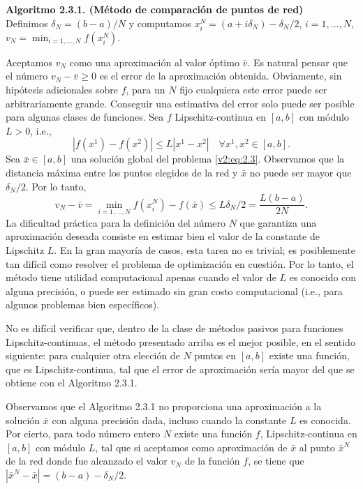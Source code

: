\noindent \textbf{Algoritmo 2.3.1. (Método de comparación de puntos de red)} \\
Definimos $\delta_N = (b - a)/N$ y computamos $x_i^N = (a + i\delta_N) - \delta_N/2$, $i = 1, \dots, N$, $v_N = \min_{i=1,\dots,N} f(x_i^N)$.

Aceptamos $v_N$ como una aproximación al valor óptimo $\bar{v}$. Es natural pensar que el número $v_N - \bar{v} \ge 0$ es el error de la aproximación obtenida. Obviamente, sin hipótesis adicionales sobre $f$, para un $N$ fijo cualquiera este error puede ser arbitrariamente grande. Conseguir una estimativa del error solo puede ser posible para algunas clases de funciones. Sea $f$ Lipschitz-continua en $[a, b]$ con módulo $L > 0$, i.e.,
\[
    |f(x^1) - f(x^2)| \le L|x^1 - x^2| \quad \forall x^1, x^2 \in [a, b].
\]
Sea $\bar{x} \in [a, b]$ una solución global del problema \eqref{v2:eq:2.3}. Observamos que la distancia máxima entre los puntos elegidos de la red y $\bar{x}$ no puede ser mayor que $\delta_N/2$. Por lo tanto,
\[
    v_N - \bar{v} = \min_{i=1,\dots,N} f(x_i^N) - f(\bar{x}) \le L \delta_N/2 = \frac{L(b - a)}{2N}.
\]
La dificultad práctica para la definición del número $N$ que garantiza una aproximación deseada consiste en estimar bien el valor de la constante de Lipschitz $L$. En la gran mayoría de casos, esta tarea no es trivial; es posiblemente tan difícil como resolver el problema de optimización en cuestión. Por lo tanto, el método tiene utilidad computacional apenas cuando el valor de $L$ es conocido con alguna precisión, o puede ser estimado sin gran costo computacional (i.e., para algunos problemas bien específicos).

No es difícil verificar que, dentro de la clase de métodos pasivos para funciones Lipschitz-continuas, el método presentado arriba es el mejor posible, en el sentido siguiente: para cualquier otra elección de $N$ puntos en $[a, b]$ existe una función, que es Lipschitz-continua, tal que el error de aproximación sería mayor del que se obtiene con el Algoritmo 2.3.1.

Observamos que el Algoritmo 2.3.1 no proporciona una aproximación a la solución $\bar{x}$ con alguna precisión dada, incluso cuando la constante $L$ es conocida. Por cierto, para todo número entero $N$ existe una función $f$, Lipschitz-continua en $[a, b]$ con módulo $L$, tal que si aceptamos como aproximación de $\bar{x}$ al punto $\bar{x}^N$ de la red donde fue alcanzado el valor $v_N$ de la función $f$, se tiene que $|\bar{x}^N - \bar{x}| = (b - a) - \delta_N/2$.

